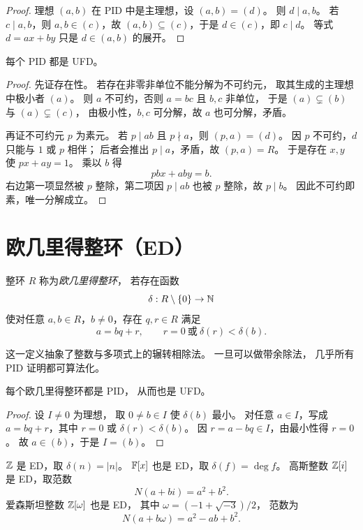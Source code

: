 \begin{proof}
 理想 $(a,b)$ 在 PID 中是主理想，设 $(a,b)=(d)$。
则 $d\mid a,b$。
若 $c\mid a,b$，则 $a,b\in(c)$，故 $(a,b)\subseteq(c)$，于是 $d\in(c)$，即 $c\mid d$。
等式 $d=ax+by$ 只是 $d\in(a,b)$ 的展开。
\end{proof}

\begin{theorem}
每个 PID 都是 UFD。
\end{theorem}

\begin{proof}
先证存在性。
若存在非零非单位不能分解为不可约元，
取其生成的主理想中极小者 $(a)$。
则 $a$ 不可约，否则 $a=bc$ 且 $b,c$ 非单位，
于是 $(a)\subsetneq (b)$ 与 $(a)\subsetneq(c)$，
由极小性，$b,c$ 可分解，故 $a$ 也可分解，矛盾。

再证不可约元 $p$ 为素元。
若 $p\mid ab$ 且 $p\nmid a$，则 $(p,a)=(d)$。
因 $p$ 不可约，$d$ 只能与 $1$ 或 $p$ 相伴；
后者会推出 $p\mid a$，矛盾，故 $(p,a)=R$。
于是存在 $x,y$ 使 $px+ay=1$。
乘以 $b$ 得
\[
pbx+aby=b.
\]
右边第一项显然被 $p$ 整除，第二项因 $p\mid ab$ 也被 $p$ 整除，故 $p\mid b$。
因此不可约即素，唯一分解成立。
\end{proof}

\section{欧几里得整环（ED）}

\begin{definition}
整环 $R$ 称为\emph{欧几里得整环}，
若存在函数
\[
\delta:R\setminus\{0\}\to \mathbb{N}
\]
使对任意 $a,b\in R$，$b\ne0$，存在 $q,r\in R$ 满足
\[
a=bq+r,
\qquad r=0\ \text{或}\ \delta(r)<\delta(b).
\]
\end{definition}

这一定义抽象了整数与多项式上的辗转相除法。
一旦可以做带余除法，
几乎所有 PID 证明都可算法化。

\begin{theorem}
每个欧几里得整环都是 PID，
从而也是 UFD。
\end{theorem}

\begin{proof}
设 $I\ne0$ 为理想，
取 $0\ne b\in I$ 使 $\delta(b)$ 最小。
对任意 $a\in I$，写成 $a=bq+r$，其中 $r=0$ 或 $\delta(r)<\delta(b)$。
因 $r=a-bq\in I$，由最小性得 $r=0$。
故 $a\in(b)$，于是 $I=(b)$。
\end{proof}

\begin{example}
$\mathbb{Z}$ 是 ED，取 $\delta(n)=|n|$。
$\mathbb{F}[x]$ 也是 ED，取 $\delta(f)=\deg f$。
高斯整数 $\mathbb{Z}[i]$ 是 ED，取范数
\[
N(a+bi)=a^2+b^2.
\]
爱森斯坦整数 $\mathbb{Z}[\omega]$ 也是 ED，
其中 $\omega=(-1+\sqrt{-3})/2$，
范数为
\[
N(a+b\omega)=a^2-ab+b^2.
\]
\end{example}

